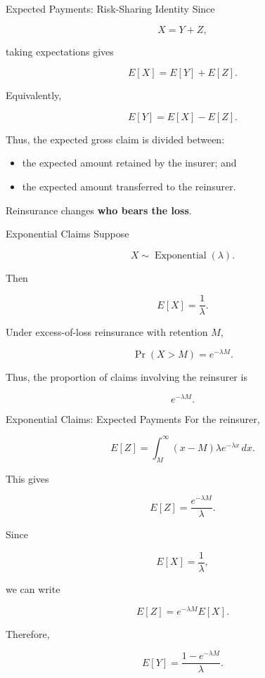 \documentclass[
  ignorenonframetext,
  aspectratio=169,
]{beamer}
\providecommand{\tightlist}{%
  \setlength{\itemsep}{0pt}\setlength{\parskip}{0pt}}
\begin{document}
\begin{frame}{Expected Payments: Risk-Sharing Identity}
\protect{}\label{expected-payments-risk-sharing-identity}
Since

\[
X=Y+Z,
\]

taking expectations gives

\[
\boxed{
E[X]=E[Y]+E[Z].
}
\]

Equivalently,

\[
E[Y]=E[X]-E[Z].
\]

Thus, the expected gross claim is divided between:

\begin{itemize}
\tightlist
\item
  the expected amount retained by the insurer; and
\item
  the expected amount transferred to the reinsurer.
\end{itemize}

Reinsurance changes \textbf{who bears the loss}.
\end{frame}

\begin{frame}{Exponential Claims}
\protect{}\label{exponential-claims}
Suppose

\[
X\sim\operatorname{Exponential}(\lambda).
\]

Then

\[
E[X]=\frac{1}{\lambda}.
\]

Under excess-of-loss reinsurance with retention \(M\),

\[
\Pr(X>M)=e^{-\lambda M}.
\]

Thus, the proportion of claims involving the reinsurer is

\[
\boxed{e^{-\lambda M}}.
\]
\end{frame}

\begin{frame}{Exponential Claims: Expected Payments}
\protect{}\label{exponential-claims-expected-payments}
For the reinsurer,

\[
E[Z]
=
\int_M^\infty (x-M)\lambda e^{-\lambda x}\,dx.
\]

This gives

\[
\boxed{
E[Z]=\frac{e^{-\lambda M}}{\lambda}.
}
\]

Since

\[
E[X]=\frac{1}{\lambda},
\]

we can write

\[
\boxed{
E[Z]=e^{-\lambda M}E[X].
}
\]

Therefore,

\[
\boxed{
E[Y]=\frac{1-e^{-\lambda M}}{\lambda}.
}
\]
\end{frame}
\end{document}
